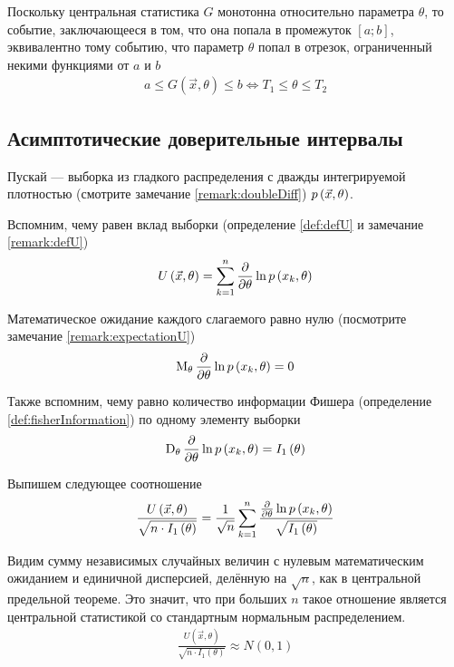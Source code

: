 Поскольку центральная статистика $G$ монотонна относительно параметра $\theta$,
то событие, заключающееся в том, что она попала в промежуток
$\left[ a; b \right]$, эквивалентно тому событию, что параметр $\theta$ попал
в отрезок, ограниченный некими функциями от $a$ и $b$
\begin{align*}
  a \le G\left( \vec{x}, \theta \right) \le b
  \Leftrightarrow T_1 \le \theta \le T_2
\end{align*}

\subsection{Асимптотические доверительные интервалы}

Пускай \xsample --- выборка из гладкого распределения с дважды
интегрируемой плотностью (смотрите замечание \ref{remark:doubleDiff})
$p\left(\vec{x}, \theta\right)$.

Вспомним, чему равен вклад выборки (определение \ref{def:defU} и замечание
\ref{remark:defU})
\begin{align*}
  U\left( \vec{x},\theta \right)
  = \sum_{k=1}^n\frac{\partial}{\partial\theta}\ln{p\left(x_k,\theta\right)}
\end{align*}

Математическое ожидание каждого слагаемого равно нулю
(посмотрите замечание \ref{remark:expectationU})
\begin{align*}
  \operatorname{M}_{\theta} \frac{\partial}{\partial \theta} \ln{p\left(x_k, \theta\right)}
  = 0
\end{align*}

Также вспомним, чему равно количество информации Фишера (определение
\ref{def:fisherInformation}) по одному элементу выборки
\begin{align*}
  \operatorname{D}_{\theta} \frac{\partial}{\partial\theta}
      \ln{p\left(x_k, \theta\right)}
  = I_1\left( \theta \right)
\end{align*}

Выпишем следующее соотношение
\begin{align*}
  \frac{U\left( \vec{x}, \theta \right)}{
      \sqrt{n \cdot I_1\left( \theta \right)}}
  = \frac{1}{\sqrt{n}} \sum_{k=1}^{n}\frac{
      \frac{\partial}{\partial\theta}\ln{p\left(x_k, \theta\right)}}{
      \sqrt{I_1\left( \theta \right)}}
\end{align*}

Видим сумму независимых случайных величин с нулевым математическим ожиданием и
единичной дисперсией, делённую на $\sqrt{n}$, как в центральной предельной
теореме. Это значит, что при больших $n$ такое отношение является центральной
статистикой со стандартным нормальным распределением.
\begin{align*}
  \frac{U\left( \vec{x}, \theta \right)}{
      \sqrt{n \cdot I_1\left( \theta \right)}} \approx N\left( 0, 1 \right)
\end{align*}

